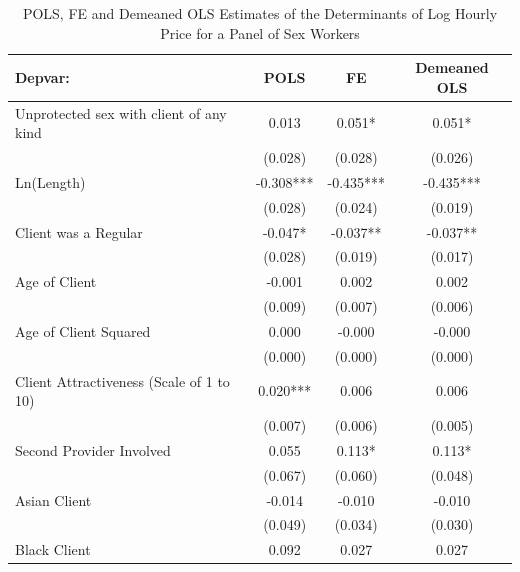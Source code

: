 \documentclass[notes=show]{beamer}
\begin{document}
\begin{frame}[plain]
\begin{table}[htbp]\centering
\tiny
\caption{POLS, FE and Demeaned OLS Estimates of the Determinants of Log Hourly Price for a Panel of Sex Workers}
\label{sasp}
\begin{center}
\begin{threeparttable}
\begin{tabular}{l*{3}{c}}
\toprule
\multicolumn{1}{l}{\textbf{Depvar:}}&
\multicolumn{1}{c}{\textbf{POLS}}&
\multicolumn{1}{c}{\textbf{FE}}&
\multicolumn{1}{c}{\textbf{Demeaned OLS}}\\
\midrule
Unprotected sex with client of any kind					&       0.013   &       0.051*  &       0.051* \\
                    									&     (0.028)   &     (0.028)   &     (0.026) \\
Ln(Length)          									&      -0.308***&      -0.435***&      -0.435*** \\
                    									&     (0.028)   &     (0.024)   &     (0.019) \\
Client was a Regular									&      -0.047*  &      -0.037** &      -0.037** \\
                    									&     (0.028)   &     (0.019)   &     (0.017) \\
Age of Client       									&      -0.001   &       0.002   &       0.002 \\
                    									&     (0.009)   &     (0.007)   &     (0.006) \\
Age of Client Squared									&       0.000   &      -0.000   &      -0.000 \\
                    									&     (0.000)   &     (0.000)   &     (0.000) \\
Client Attractiveness (Scale of 1 to 10)				&       0.020***&       0.006   &       0.006 \\
                    									&     (0.007)   &     (0.006)   &     (0.005) \\
Second Provider Involved								&       0.055   &       0.113*  &       0.113* \\
                    									&     (0.067)   &     (0.060)   &     (0.048) \\
Asian Client        									&      -0.014   &      -0.010   &      -0.010 \\
                    									&     (0.049)   &     (0.034)   &     (0.030) \\
Black Client        									&       0.092   &       0.027   &       0.027 \\

\end{tabular}
\end{threeparttable}
\end{center}
\end{table}
\end{frame}
\end{document}

